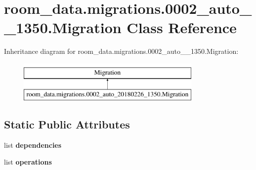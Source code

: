 \hypertarget{classroom__data_1_1migrations_1_10002__auto__20180226__1350_1_1_migration}{\section{room\-\_\-data.\-migrations.0002\-\_\-auto\-\_\-\_\-1350.Migration Class Reference}
\label{classroom__data_1_1migrations_1_10002__auto__20180226__1350_1_1_migration}
}
Inheritance diagram for room\-\_\-data.\-migrations.0002\-\_\-auto\-\_\-\_\-1350.Migration\-:\begin{figure}[H]
\begin{center}
\leavevmode
\includegraphics[height=2.000000cm]{classroom__data_1_1migrations_1_10002__auto__20180226__1350_1_1_migration}
\end{center}
\end{figure}
\subsection*{Static Public Attributes}
\begin{DoxyCompactItemize}
\item 
list {\bfseries dependencies}
\item 
list {\bfseries operations}
\end{DoxyCompactItemize}


